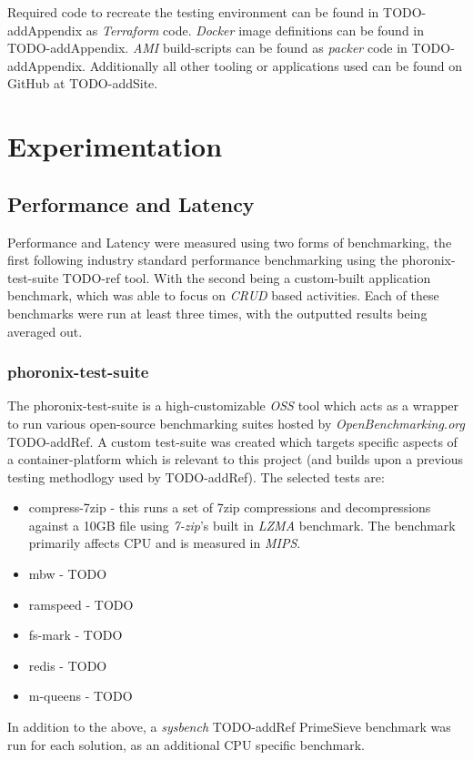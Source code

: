 \noindent Required code to recreate the testing environment can be found in TODO-addAppendix as \emph{Terraform} code.
\emph{Docker} image definitions can be found in TODO-addAppendix.
\emph{AMI} build-scripts can be found as \emph{packer} code in TODO-addAppendix.
Additionally all other tooling or applications used can be found on GitHub at TODO-addSite.

\chapter{Experimentation}
\section{Performance and Latency}
Performance and Latency were measured using two forms of benchmarking, the first following industry standard performance benchmarking using the phoronix-test-suite TODO-ref tool.
With the second being a custom-built application benchmark, which was able to focus on \emph{CRUD} based activities.
Each of these benchmarks were run at least three times, with the outputted results being averaged out.

\subsection{phoronix-test-suite}
The phoronix-test-suite is a high-customizable \emph{OSS} tool which acts as a wrapper to run various open-source benchmarking suites hosted by \emph{OpenBenchmarking.org} TODO-addRef.
A custom test-suite was created which targets specific aspects of a container-platform which is relevant to this project (and builds upon a previous testing methodlogy used by TODO-addRef).
The selected tests are:
\begin{itemize}
  \item compress-7zip - this runs a set of 7zip compressions and decompressions against a 10GB file using \emph{7-zip}'s built in \emph{LZMA} benchmark.
        The benchmark primarily affects CPU and is measured in \emph{MIPS}.
  \item mbw - TODO
  \item ramspeed - TODO
  \item fs-mark - TODO
  \item redis - TODO
  \item m-queens - TODO
\end{itemize}
In addition to the above, a \emph{sysbench} TODO-addRef PrimeSieve benchmark was run for each solution, as an additional CPU specific benchmark.


